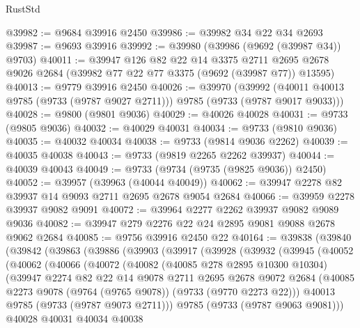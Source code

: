\begin{lexlean}{RustStd}
\begin{coremodule}
@39982 := @9684 @39916 @2450
@39986 := @39982 @34 @22 @34 @2693
@39987 := @9693 @39916
@39992 := @39980 (@39986 (@9692 (@39987 @34)) @9703)
@40011 := @39947
    @126
    @82
    @22
    @14
    @3375
    @2711
    @2695
    @2678
    @9026
    @2684
    (@39982 @77 @22 @77 @3375 (@9692 (@39987 @77)) @13595)
@40013 := @9779 @39916 @2450
@40026 := @39970
    (@39992 (@40011 @40013 @9785 (@9733 (@9787 @9027 @2711))) @9785 (@9733 (@9787 @9017 @9033)))
@40028 := @9800 (@9801 @9036)
@40029 := @40026 @40028
@40031 := @9733 (@9805 @9036)
@40032 := @40029 @40031
@40034 := @9733 (@9810 @9036)
@40035 := @40032 @40034
@40038 := @9733 (@9814 @9036 @2262)
@40039 := @40035 @40038
@40043 := @9733 (@9819 @2265 @2262 @39937)
@40044 := @40039 @40043
@40049 := @9733 (@9734 (@9735 (@9825 @9036)) @2450)
@40052 := @39957 (@39963 (@40044 @40049))
@40062 := @39947 @2278 @82 @39937 @14 @9093 @2711 @2695 @2678 @9054 @2684
@40066 := @39959 @2278 @39937 @9082 @9091
@40072 := @39964 @2277 @2262 @39937 @9082 @9089 @9036
@40082 := @39947 @279 @2276 @22 @24 @2895 @9081 @9088 @2678 @9062 @2684
@40085 := @9756 @39916 @2450 @22
@40164 := @39838
    (@39840
      (@39842
        (@39863
          (@39886
            (@39903
              (@39917
                (@39928
                  (@39932
                    (@39945
                      (@40052
                        (@40062
                          (@40066
                            (@40072
                              (@40082
                                (@40085 @278 @2895 @10300 @10304)
                                (@39947
                                  @2274
                                  @82
                                  @22
                                  @14
                                  @9078
                                  @2711
                                  @2695
                                  @2678
                                  @9072
                                  @2684
                                  (@40085
                                    @2273
                                    @9078
                                    (@9764 (@9765 @9078))
                                    (@9733 (@9770 @2273 @22)))
                                  @40013
                                  @9785
                                  (@9733 (@9787 @9073 @2711)))
                                @9785
                                (@9733 (@9787 @9063 @9081)))
                              @40028
                              @40031
                              @40034
                              @40038

\end{coremodule}
\end{lexlean}
